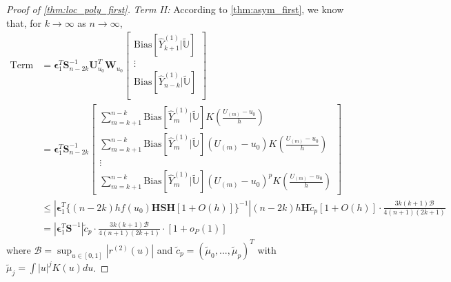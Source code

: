 \documentclass{uwstat572}
\theoremstyle{definition}
\renewcommand{\hat}{\widehat}
\renewcommand{\tilde}{\widetilde}
\theoremstyle{theorem}
\begin{document}
\begin{proof}[Proof of \autoref{thm:loc_poly_first}]
\emph{Term II:} According to \autoref{thm:asym_first}, we know that, for $k\to \infty$ as $n\to \infty$,
\begin{align*}
\text{Term II} &= \bm{\epsilon}_1^T \bm{S}_{n-2k}^{-1} \bm{U}_{u_0}^T \bm{W}_{u_0}\begin{bmatrix}
	\mathrm{Bias}\left[\hat{Y}_{k+1}^{(1)} \big|\tilde{\mathbb{U}}\right]\\
	\vdots\\
	\mathrm{Bias}\left[\hat{Y}_{n-k}^{(1)} \big|\tilde{\mathbb{U}}\right]\\
\end{bmatrix}\\
&= \bm{\epsilon}_1^T \bm{S}_{n-2k}^{-1} 
\begin{bmatrix}
\sum_{m=k+1}^{n-k} \text{Bias}\left[\hat{Y}_m^{(1)} \big| \tilde{\mathbb{U}}\right] K\left(\frac{U_{(m)}-u_0}{h}\right)\\
\sum_{m=k+1}^{n-k} \text{Bias}\left[\hat{Y}_m^{(1)} \big| \tilde{\mathbb{U}}\right] \left(U_{(m)} -u_0\right) K\left(\frac{U_{(m)}-u_0}{h}\right)\\
\vdots\\
\sum_{m=k+1}^{n-k} \text{Bias}\left[\hat{Y}_m^{(1)} \big| \tilde{\mathbb{U}}\right] \left(U_{(m)} -u_0\right)^p K\left(\frac{U_{(m)}-u_0}{h}\right)
\end{bmatrix}\\
&\leq \left|\bm{\epsilon}_1^T  \big\{(n-2k)h f(u_0) \bm{H}\bm{S}\bm{H}\left[1 + O(h)\right]\big\}^{-1} \right|  (n-2k)h\bm{H} \tilde{c}_p \left[1+O(h)\right] \cdot \frac{3k(k+1)\mathcal{B}}{4(n+1)(2k+1)} \\
&= \left|\bm{\epsilon}_1^T \bm{S}^{-1}\right| \tilde{c}_p\cdot \frac{3k(k+1)\mathcal{B}}{4(n+1)(2k+1)}\cdot\left[1+o_P(1)\right]
\end{align*}
where $\mathcal{B}= \sup_{u\in [0,1]}\left|r^{(2)}(u) \right|$ and $\tilde{c}_p=\left(\tilde{\mu}_0,...,\tilde{\mu}_{p} \right)^T$ with $\tilde{\mu}_j=\int |u|^j K(u) du$.


\end{proof}
\end{document}
